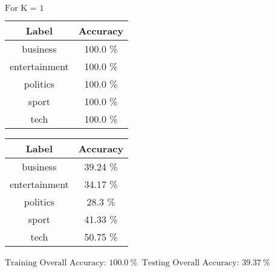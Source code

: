 \documentclass[8pt]{extarticle}
\begin{document}
    $\displaystyle \text{For K = }1$
    \begin{center}
        \quad
    \end{center}
    \begin{center}
        \begin{tabular}{cc}
            \hline
            Label & Accuracy\\
            \hline
            business &   100.0 \% \\
       entertainment &   100.0 \% \\
           politics  &   100.0 \% \\
              sport  &   100.0 \% \\
               tech  &   100.0 \%
         \end{tabular}
         \quad
        \begin{tabular}{cc}
            \hline
            Label & Accuracy\\
            \hline
            business &   39.24 \% \\
        entertainment &  34.17 \% \\
           politics  &   28.3 \% \\
              sport  &   41.33  \% \\
               tech  &   50.75 \%
        \end{tabular}
    \end{center}
    \begin{center}
        $\displaystyle \text{Training Overall Accuracy:\ }100.0\ \%$
        $\displaystyle \ \text{Testing Overall Accuracy:\ }39.37\ \%$
    \end{center}
\end{document}
